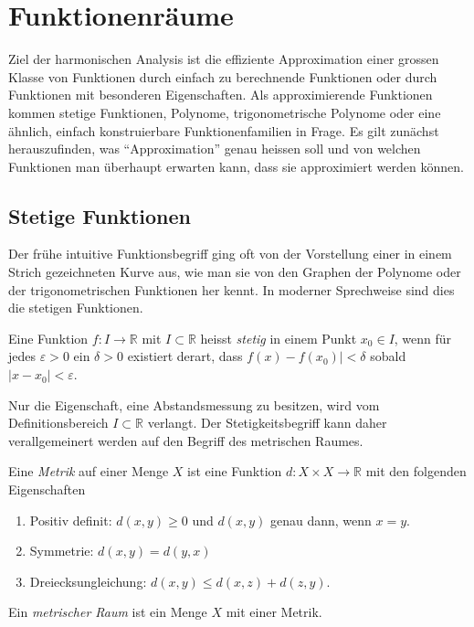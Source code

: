 %
%
%
\section{Funktionenräume
\label{buch:skalarprodukt:section:funktionenraeume}}
Ziel der harmonischen Analysis ist die effiziente Approximation einer
grossen Klasse von Funktionen durch einfach zu berechnende Funktionen
oder durch Funktionen mit besonderen Eigenschaften.
Als approximierende Funktionen kommen stetige Funktionen, Polynome,
trigonometrische Polynome oder eine ähnlich, einfach konstruierbare
Funktionenfamilien in Frage.
Es gilt zunächst herauszufinden, was ``Approximation'' genau heissen
soll und von welchen Funktionen man überhaupt erwarten kann, dass sie
approximiert werden können.

%
%
\subsection{Stetige Funktionen
\label{buch:skalarprodukt:subsection:stetige-funktionen}}
Der frühe intuitive Funktionsbegriff ging oft von der Vorstellung einer
in einem Strich gezeichneten Kurve aus, wie man sie von den Graphen
der Polynome oder der trigonometrischen Funktionen her kennt.
In moderner Sprechweise sind dies die stetigen Funktionen.

\begin{definition}[stetig]
Eine Funktion $f\colon I\to\mathbb{R}$ mit $I\subset \mathbb{R}$
heisst {\em stetig} in einem Punkt $x_0\in I$, wenn für jedes $\varepsilon>0$
ein $\delta>0$ existiert derart, dass $f(x)-f(x_0)|<\delta$ sobald
$|x-x_0|<\varepsilon$.
%
\end{definition}

Nur die Eigenschaft, eine Abstandsmessung zu besitzen, wird vom
Definitionsbereich $I\subset \mathbb{R}$ verlangt.
Der Stetigkeitsbegriff kann daher verallgemeinert werden auf den
Begriff des metrischen Raumes.

\begin{definition}[Metrik]
Eine {\em Metrik} auf einer Menge $X$ ist eine Funktion
%
$d\colon X\times X\to \mathbb{R}$
mit den folgenden Eigenschaften
\begin{enumerate}
\item
Positiv definit: $d(x,y)\ge 0$ und $d(x,y)$ genau dann, wenn $x=y$.
\item
Symmetrie: \(d(x,y)=d(y,x)\)
\item
Dreiecksungleichung: \( d(x,y) \le d(x,z) + d(z,y) \).
\end{enumerate}
Ein {\em metrischer Raum} ist ein Menge $X$ mit einer Metrik.
%
\end{definition}


